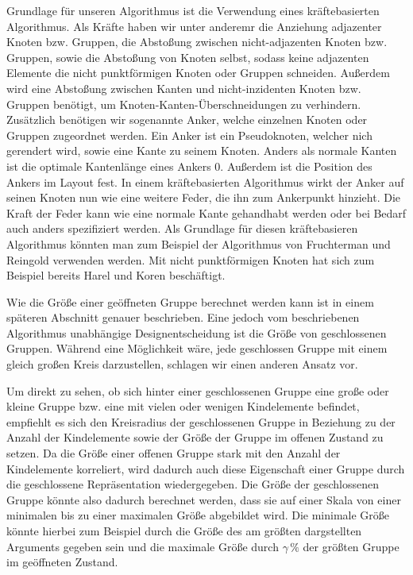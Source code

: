 Grundlage für unseren Algorithmus ist die Verwendung eines kräftebasierten Algorithmus. Als Kräfte haben wir unter anderemr die Anziehung adjazenter Knoten bzw. Gruppen,
die Abstoßung zwischen nicht-adjazenten Knoten bzw. Gruppen, sowie die Abstoßung von Knoten selbst, sodass keine adjazenten Elemente die nicht punktförmigen Knoten oder Gruppen schneiden. Außerdem wird eine Abstoßung zwischen Kanten und nicht-inzidenten Knoten bzw. Gruppen benötigt, um Knoten-Kanten-Überschneidungen zu verhindern.
Zusätzlich benötigen wir sogenannte Anker, welche einzelnen Knoten oder Gruppen zugeordnet werden. 
Ein Anker ist ein Pseudoknoten, welcher  nich gerendert wird, sowie eine Kante zu seinem Knoten. 
Anders als normale Kanten ist die optimale Kantenlänge eines Ankers  0. Außerdem ist die Position des Ankers im Layout fest. 
In einem kräftebasierten Algorithmus wirkt der Anker auf seinen Knoten nun wie eine weitere Feder, die ihn zum Ankerpunkt hinzieht.
Die Kraft der Feder kann wie eine normale Kante gehandhabt werden oder bei Bedarf auch anders spezifiziert werden.
Als Grundlage für diesen kräftebasieren Algorithmus könnten man zum Beispiel der Algorithmus von Fruchterman und Reingold \cite{SPE:SPE4380211102} verwenden werden.
Mit nicht punktförmigen Knoten hat sich zum Beispiel bereits Harel und Koren \cite{Harel:2002:DGN:1556262.1556288} beschäftigt.


Wie die Größe einer geöffneten Gruppe berechnet werden kann ist in einem späteren Abschnitt genauer beschrieben. 
Eine jedoch vom beschriebenen Algorithmus unabhängige Designentscheidung ist die Größe von geschlossenen Gruppen.
Während eine Möglichkeit wäre, jede geschlossen Gruppe mit einem gleich großen Kreis darzustellen, schlagen wir einen anderen Ansatz vor.

Um direkt zu sehen, ob sich hinter einer geschlossenen Gruppe eine große oder kleine Gruppe bzw. eine mit vielen oder wenigen Kindelemente befindet, empfiehlt es sich den Kreisradius der geschlossenen Gruppe in Beziehung zu der Anzahl der Kindelemente sowie der Größe der Gruppe im offenen Zustand zu setzen.
Da die Größe einer offenen Gruppe stark mit den Anzahl der Kindelemente korreliert, wird dadurch auch diese Eigenschaft einer Gruppe durch die geschlossene Repräsentation
wiedergegeben.
Die Größe der geschlossenen Gruppe könnte also dadurch berechnet werden, dass sie auf einer Skala von einer minimalen bis zu einer maximalen Größe abgebildet wird.
Die minimale Größe könnte hierbei zum Beispiel durch die Größe des am größten dargstellten Arguments gegeben sein und die maximale Größe durch $\gamma \,\%$ 
der größten Gruppe im geöffneten Zustand.

